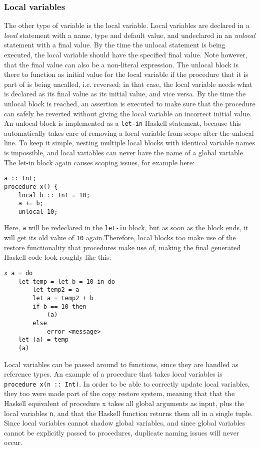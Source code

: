 \documentclass[12pt,a4paper]{article}
\newcommand{\inlinecode}[1]{\texttt{#1}}
\begin{document}
\subsubsection{Local variables}
The other type of variable is the local variable. Local variables are declared in a \emph{local} statement with a name, type and default value, and undeclared in an \emph{unlocal} statement with a final value. By the time the unlocal statement is being executed, the local variable should have the specified final value. Note however, that the final value can also be a non-literal expression. The unlocal block is there to function as initial value for the local variable if the procedure that it is part of is being uncalled, i.e. reversed: in that case, the local variable needs what is declared as its final value as its initial value, and vice versa. By the time the unlocal block is reached, an assertion is executed to make sure that the procedure can safely be reverted without giving the local variable an incorrect initial value. An unlocal block is implemented as a \inlinecode{let-in} Haskell statement, because this automatically takes care of removing a local variable from scope after the unlocal line. To keep it simple, nesting multiple local blocks with identical variable names is impossible, and local variables can never have the name of a global variable. The let-in block again causes scoping issues, for example here:
            
\begin{verbatim}
a :: Int;
procedure x() {
    local b :: Int = 10;
    a += b;
    unlocal 10;
\end{verbatim}

\noindent Here, \inlinecode{a} will be redeclared in the \inlinecode{let-in} block, but as soon as the block ends, it will get its old value of \inlinecode{10} again.Therefore, local blocks too make use of the restore functionality that procedures make use of, making the final generated Haskell code look roughly like this:

\begin{verbatim}
x a = do
    let temp = let b = 10 in do
        let temp2 = a
        let a = temp2 + b
        if b == 10 then
            (a)
        else
            error <message>
    let (a) = temp
    (a)
\end{verbatim}

Local variables can be passed around to functions, since they are handled as reference types. An example of a procedure that takes local variables is \inlinecode{procedure x(n :: Int)}. In order to be able to correctly update local variables, they too were made part of the copy restore system, meaning that that the Haskell equivalent of procedure x takes all global arguments as input, plus the local variables \inlinecode{n}, and that the Haskell function returns them all in a single tuple. Since local variables cannot shadow global variables, and since global variables cannot be explicitly passed to procedures, duplicate naming issues will never occur.
\end{document}
